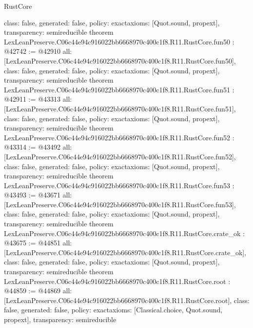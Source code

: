 \begin{lexlean}{RustCore}
\begin{coremodule}
{  class: false,
  generated: false,
  policy: exact{axioms: [Quot.sound, propext]},
  transparency: semireducible
}
theorem LexLeanPreserve.C06c44e94c916022bb6668970c400c1f8.R11.RustCore.fun50 : @42742 := @42910 {
  all: [LexLeanPreserve.C06c44e94c916022bb6668970c400c1f8.R11.RustCore.fun50],
  class: false,
  generated: false,
  policy: exact{axioms: [Quot.sound, propext]},
  transparency: semireducible
}
theorem LexLeanPreserve.C06c44e94c916022bb6668970c400c1f8.R11.RustCore.fun51 : @42911 := @43313 {
  all: [LexLeanPreserve.C06c44e94c916022bb6668970c400c1f8.R11.RustCore.fun51],
  class: false,
  generated: false,
  policy: exact{axioms: [Quot.sound, propext]},
  transparency: semireducible
}
theorem LexLeanPreserve.C06c44e94c916022bb6668970c400c1f8.R11.RustCore.fun52 : @43314 := @43492 {
  all: [LexLeanPreserve.C06c44e94c916022bb6668970c400c1f8.R11.RustCore.fun52],
  class: false,
  generated: false,
  policy: exact{axioms: [Quot.sound, propext]},
  transparency: semireducible
}
theorem LexLeanPreserve.C06c44e94c916022bb6668970c400c1f8.R11.RustCore.fun53 : @43493 := @43671 {
  all: [LexLeanPreserve.C06c44e94c916022bb6668970c400c1f8.R11.RustCore.fun53],
  class: false,
  generated: false,
  policy: exact{axioms: [Quot.sound, propext]},
  transparency: semireducible
}
theorem LexLeanPreserve.C06c44e94c916022bb6668970c400c1f8.R11.RustCore.crate_ok : @43675 := @44851 {
  all: [LexLeanPreserve.C06c44e94c916022bb6668970c400c1f8.R11.RustCore.crate_ok],
  class: false,
  generated: false,
  policy: exact{axioms: [Quot.sound, propext]},
  transparency: semireducible
}
theorem LexLeanPreserve.C06c44e94c916022bb6668970c400c1f8.R11.RustCore.root : @44859 := @44869 {
  all: [LexLeanPreserve.C06c44e94c916022bb6668970c400c1f8.R11.RustCore.root],
  class: false,
  generated: false,
  policy: exact{axioms: [Classical.choice, Quot.sound, propext]},
  transparency: semireducible
}


\end{coremodule}
\end{lexlean}

